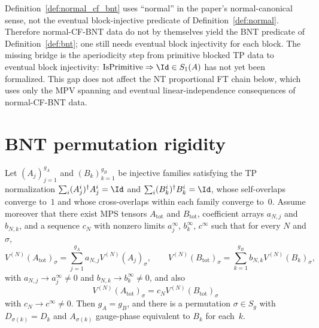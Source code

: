 \begin{remark}\label{rem:normalcf_bnt_gap}
		Definition~\ref{def:normal_cf_bnt} uses ``normal'' in the paper's normal-canonical sense,
		not the eventual block-injective predicate of
		Definition~\ref{def:normal}. Therefore normal-CF-BNT data do not by
		themselves yield the BNT predicate of Definition~\ref{def:bnt}; one
		still needs eventual block injectivity for each block. The missing
		bridge is the aperiodicity step from primitive blocked TP data to
		eventual block injectivity:
		$\mathrm{IsPrimitive} \Rightarrow \Id \in S_1(A)$ has not yet been
		formalized.
		This gap does not affect the NT proportional FT chain below, which uses
		only the MPV spanning and eventual linear-independence consequences of
		normal-CF-BNT data.
\end{remark}

\section{BNT permutation rigidity}

\begin{theorem}\label{thm:bnt_perm_prop}
	\leanok
	Let $(A_j)_{j=1}^{g_A}$ and $(B_k)_{k=1}^{g_B}$ be injective
	families satisfying the TP normalization
	$\sum_i (A_j^i)^\dagger A_j^i = \Id$ and
	$\sum_i (B_k^i)^\dagger B_k^i = \Id$, whose self-overlaps
	converge to~$1$ and whose cross-overlaps within each family
	converge to~$0$.
	Assume moreover that there exist MPS tensors $A_{\mathrm{tot}}$
	and $B_{\mathrm{tot}}$, coefficient arrays $a_{N,j}$ and $b_{N,k}$,
	and a sequence $c_N$ with nonzero limits $a_j^\infty$, $b_k^\infty$,
	$c^\infty$ such that for every $N$ and $\sigma$,
	\[
		V^{(N)}(A_{\mathrm{tot}})_\sigma
		= \sum_{j=1}^{g_A} a_{N,j} V^{(N)}(A_j)_\sigma,
		\qquad
		V^{(N)}(B_{\mathrm{tot}})_\sigma
		= \sum_{k=1}^{g_B} b_{N,k} V^{(N)}(B_k)_\sigma,
	\]
	with $a_{N,j} \to a_j^\infty \neq 0$ and
	$b_{N,k} \to b_k^\infty \neq 0$, and also
	\[
		V^{(N)}(A_{\mathrm{tot}})_\sigma
		= c_N V^{(N)}(B_{\mathrm{tot}})_\sigma
	\]
	with $c_N \to c^\infty \neq 0$.
	Then $g_A = g_B$, and there is a permutation
	$\sigma \in S_g$ with $D_{\sigma(k)} = D_k$ and
	$A_{\sigma(k)}$ gauge-phase equivalent to $B_k$ for each~$k$.
\end{theorem}

